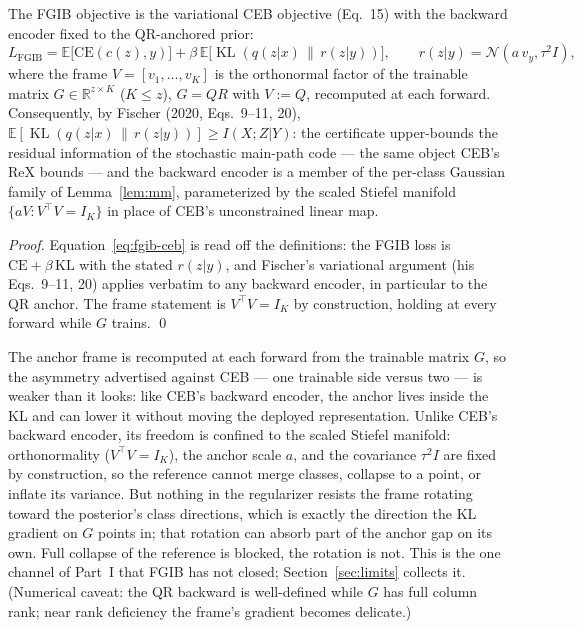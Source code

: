 \begin{proposition}\label{prop:fgib-ceb}
The FGIB objective is the variational CEB objective (Eq.~15) with the backward encoder
fixed to the QR-anchored prior:
\begin{equation}
L_{\mathrm{FGIB}} = \mathbb{E}\big[\mathrm{CE}(c(z), y)\big]
+ \beta\,\mathbb{E}\big[\operatorname{KL}(q(z|x)\,\|\,r(z|y))\big],
\qquad
r(z|y) = \mathcal{N}(a\,v_y, \tau^2 I),
\label{eq:fgib-ceb}
\end{equation}
where the frame $V = [v_1, \dots, v_K]$ is the orthonormal factor of the trainable
matrix $G \in \mathbb{R}^{z \times K}$ ($K \le z$), $G = QR$ with $V := Q$,
recomputed at each forward. Consequently, by Fischer (2020, Eqs.~9--11, 20),
$\mathbb{E}[\operatorname{KL}(q(z|x)\,\|\,r(z|y))] \ge I(X;Z|Y)$: the certificate
upper-bounds the residual information of the stochastic main-path code --- the same
object CEB's $\mathrm{ReX}$ bounds --- and the backward encoder is a member of the
per-class Gaussian family of Lemma~\ref{lem:mm}, parameterized by the scaled Stiefel
manifold $\{aV : V^{\top}V = I_K\}$ in place of CEB's unconstrained linear map.
\end{proposition}

\begin{proof}
Equation~\eqref{eq:fgib-ceb} is read off the definitions: the FGIB loss is
$\mathrm{CE} + \beta\,\mathrm{KL}$ with the stated $r(z|y)$, and Fischer's variational
argument (his Eqs.~9--11, 20) applies verbatim to any backward encoder, in particular
to the QR anchor. The frame statement is $V^{\top}V = I_K$ by construction, holding at
every forward while $G$ trains. \hfill\qed
\end{proof}

\begin{remark}\label{rem:G-channel}
The anchor frame is recomputed at each forward from the trainable matrix $G$, so the
asymmetry advertised against CEB --- one trainable side versus two --- is weaker than it
looks: like CEB's backward encoder, the anchor lives inside the KL and can lower it
without moving the deployed representation. Unlike CEB's backward encoder, its freedom
is confined to the scaled Stiefel manifold: orthonormality ($V^{\top}V = I_K$), the
anchor scale $a$, and the covariance $\tau^2 I$ are fixed by construction, so the
reference cannot merge classes, collapse to a point, or inflate its variance. But
nothing in the regularizer resists the frame rotating toward the posterior's class
directions, which is exactly the direction the KL gradient on $G$ points in; that
rotation can absorb part of the anchor gap on its own. Full collapse of the reference
is blocked, the rotation is not. This is the one channel of Part~I that FGIB has not
closed; Section~\ref{sec:limits} collects it. (Numerical caveat: the QR backward is
well-defined while $G$ has full column rank; near rank deficiency the frame's gradient
becomes delicate.)
\end{remark}


